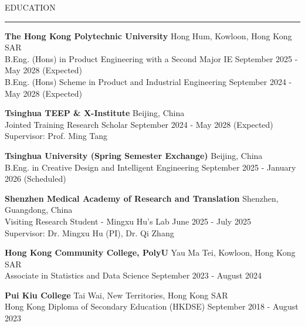 \documentclass{resume} %
\renewenvironment{rSection}[1]{
\sectionskip
\textcolor{TsinghuaPurple}{\MakeUppercase{#1}}
\sectionlineskip
\hrule
\begin{list}{}{
\setlength{\leftmargin}{0em}
}
\item[]
}{
\end{list}
}
\begin{document}
  


\begin{rSection}{Education}
{\bf The Hong Kong Polytechnic University} \hfill {Hong Hum, Kowloon, Hong Kong SAR}\\
{B.Eng. (Hons) in Product Engineering with a Second Major IE} \hfill {September 2025 - May 2028 (Expected)}\\
{B.Eng. (Hons) Scheme in Product and Industrial Engineering} \hfill {September 2024 - May 2028 (Expected)}

{\bf Tsinghua TEEP \& X-Institute} \hfill {Beijing, China}\\
{Jointed Training Research Scholar} \hfill {September 2024 - May 2028 (Expected)}\\
{Supervisor: Prof. Ming Tang}

{\bf Tsinghua University (Spring Semester Exchange)} \hfill {Beijing, China}\\
{B.Eng. in Creative Design and Intelligent Engineering} \hfill {September 2025 - January 2026 (Scheduled)}

{\bf Shenzhen Medical Academy of Research and Translation} \hfill {Shenzhen, Guangdong, China}\\
{Visiting Research Student - Mingxu Hu's Lab} \hfill {June 2025 - July 2025}\\
{Supervisor: Dr. Mingxu Hu (PI), Dr. Qi Zhang}

{\bf Hong Kong Community College, PolyU} \hfill {Yau Ma Tei, Kowloon, Hong Kong SAR}\\
{Associate in Statistics and Data Science} \hfill {September 2023 - August 2024}

{\bf Pui Kiu College} \hfill{Tai Wai, New Territories, Hong Kong SAR}\\
{Hong Kong Diploma of Secondary Education (HKDSE)} \hfill {September 2018 - August 2023}

\end{rSection} 

\end{document}

